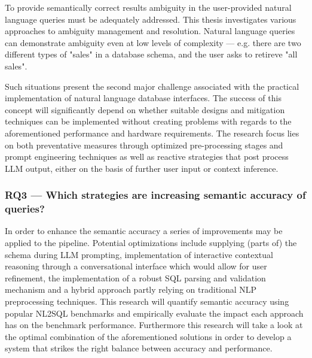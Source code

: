 To provide semantically correct results ambiguity in the user-provided natural language queries must be 
adequately addressed. This thesis investigates various approaches to ambiguity management and
resolution. Natural language queries can demonstrate ambiguity even at low levels of complexity —
e.g. there are two different types of "sales" in a database schema, and the user asks to retireve
"all sales".

Such situations present the second major challenge associated with the practical implementation of natural
language database interfaces. The success of this concept will significantly depend on whether suitable 
designs and mitigation techniques can be implemented without creating problems with regards to the 
aforementioned performance and hardware requirements. The research focus lies on both preventative measures
through optimized pre-processing stages and prompt engineering techniques as well as reactive strategies
that post process LLM output, either on the basis of further user input or context inference.

\subsubsection*{RQ3 — Which strategies are increasing semantic accuracy of queries?}

In order to enhance the semantic accuracy a series of improvements may be applied to the pipeline.
Potential optimizations include supplying (parts of) the schema during LLM prompting, implementation of
interactive contextual reasoning through a conversational interface which would allow for user
refinement, the implementation of a robust SQL parsing and validation mechanism and a hybrid approach
partly relying on traditional NLP preprocessing techniques. This research will quantify semantic accuracy
using popular NL2SQL benchmarks and empirically evaluate the impact each approach has on the benchmark
performance. Furthermore this research will take a look at the optimal combination of the aforementioned
solutions in order to develop a system that strikes the right balance between accuracy and performance.





\newpage
